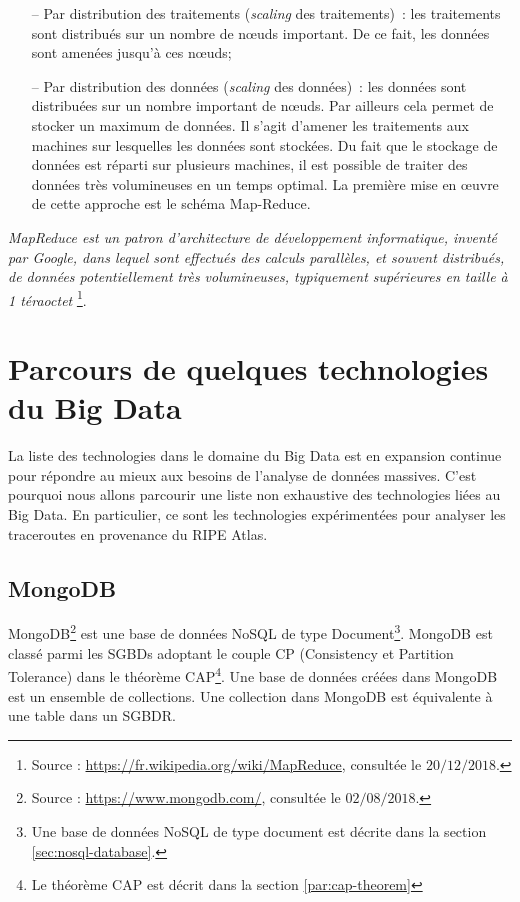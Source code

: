 		
		\begin{itemize}
			\item[--] Par distribution des traitements (\textit{scaling} des traitements)~: les traitements sont distribués sur un nombre de n\oe{}uds important. De ce fait, les données sont amenées jusqu'à ces n\oe{}uds;
			
			\item[--] Par distribution des données (\textit{scaling} des données)~: les données sont distribuées sur un nombre important de n\oe{}uds. Par ailleurs cela permet  de stocker un maximum de données. Il s'agit d'amener les traitements aux machines sur lesquelles les données sont stockées. Du fait que le stockage de données est réparti sur plusieurs machines, il est possible de traiter des données très volumineuses en un temps optimal. La première mise en \oe{}uvre de cette approche est le schéma Map-Reduce. 
		\end{itemize}
	\begin{tcolorbox}
	\textit{ MapReduce est un patron d'architecture de développement informatique, inventé par Google, dans lequel sont effectués des calculs parallèles, et souvent distribués, de données potentiellement très volumineuses, typiquement supérieures en taille à 1 téraoctet} \footnote{Source : \url{https://fr.wikipedia.org/wiki/MapReduce}, consultée le $20/12/2018$.}. 
	\end{tcolorbox}
	\section{Parcours de quelques technologies du Big Data}
La liste des technologies dans le domaine du Big Data est en expansion continue pour répondre au mieux aux besoins de l'analyse de données massives. C'est pourquoi nous allons parcourir une liste non exhaustive des technologies liées au Big Data. En particulier, ce sont les technologies expérimentées pour analyser les traceroutes en provenance du RIPE Atlas.
	
\subsection{MongoDB} \label{subsubsection:mongodb}
MongoDB\footnote{Source : \url{https://www.mongodb.com/}, consultée le $02/08/2018$.} est une base de données  NoSQL de type Document\footnote{Une base de données NoSQL de type document est décrite dans la section \ref{sec:nosql-database}.}.  MongoDB est classé parmi les  SGBDs adoptant le couple CP (Consistency et Partition Tolerance) dans le théorème  CAP\footnote{Le théorème  CAP est décrit dans la section \ref{par:cap-theorem}}. Une base de données créées dans MongoDB est un ensemble de collections. Une collection dans MongoDB est équivalente à une table dans un SGBDR.
	

